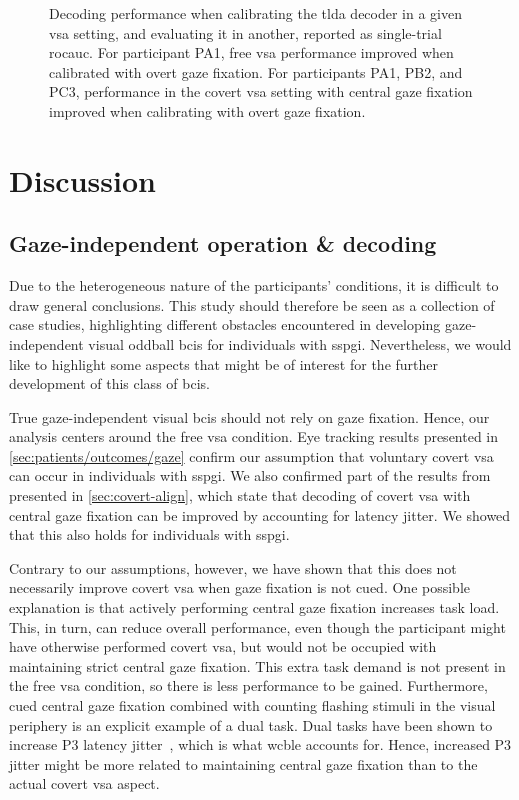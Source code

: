 \begin{figure}
  
  \caption[Cross-setting calibration and decoding performance.]{
    Decoding performance when calibrating the \ac{tlda} decoder in a given \ac{vsa}
    setting, and evaluating it in another, reported as
    single-trial \ac{rocauc}.
    For participant PA1, free \ac{vsa} performance improved when
    calibrated with overt gaze fixation.
    For participants PA1, PB2, and PC3, performance in the covert \ac{vsa} setting with central gaze fixation
    improved when calibrating with overt gaze fixation.
  }
  \label{fig:patients/cross}
\end{figure}

\section{Discussion}

\subsection{Gaze-independent operation \& decoding}
Due to the heterogeneous nature of the participants' conditions, it is difficult to
draw general conclusions.
This study should therefore be seen as a collection of case studies,
highlighting different obstacles encountered in developing gaze-independent
visual oddball \acp{bci} for individuals with \ac{sspgi}.
Nevertheless, we would like to highlight some aspects that might be
of interest for the further development of this class of \acp{bci}.

True gaze-independent visual \acp{bci} should not rely on gaze fixation.
Hence, our analysis centers around the free \ac{vsa} condition.
Eye tracking results presented in \cref{sec:patients/outcomes/gaze}
confirm our assumption that voluntary covert \ac{vsa} can
occur in individuals with \ac{sspgi}.
We also confirmed part of the results from~\textcite{VanDenKerchove2024}
presented in \cref{sec:covert-align}, which state that decoding of covert \ac{vsa} with central gaze
fixation can be improved by accounting for latency jitter. We showed that this
also holds for individuals with \ac{sspgi}.

Contrary to our assumptions, however, we have shown that this does not
necessarily improve covert \ac{vsa} when gaze fixation is not cued.
One possible explanation is that actively performing central gaze fixation
increases task load.
This, in turn, can reduce overall performance, even though the participant might
have otherwise performed covert \ac{vsa}, but would not be occupied with
maintaining strict central gaze fixation.
This extra task demand is not present in the free \ac{vsa} condition, so
there is less performance to be gained.
Furthermore, cued central gaze fixation combined with counting flashing stimuli
in the visual periphery is an explicit example of a dual task.
Dual tasks have been shown to increase P3 latency
jitter~\cite{Polich2007,Arico2014, VanDenKerchove2024},
which is what \ac{wcble} accounts for.
Hence, increased P3 jitter might be more related to maintaining central gaze fixation
than to the actual covert \ac{vsa} aspect.

